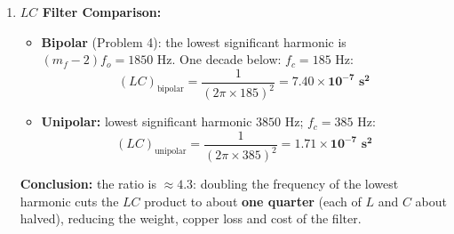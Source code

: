 \documentclass[11pt,a4paper]{article}
\begin{document}
\begin{examplebox}
\begin{enumerate}
  \item \textbf{$LC$ Filter Comparison:}
  \begin{itemize}
    \item \textbf{Bipolar} (Problem 4): the lowest significant harmonic is $(m_f - 2)f_o = 1850\text{ Hz}$. One decade below: $f_{c} = 185\text{ Hz}$:
    \begin{equation*}
    (LC)_{\text{bipolar}} = \frac{1}{(2\pi \times 185)^2} = \mathbf{7.40 \times 10^{-7}\text{ s}^2}
    \end{equation*}
    \item \textbf{Unipolar:} lowest significant harmonic $3850\text{ Hz}$; $f_{c} = 385\text{ Hz}$:
    \begin{equation*}
    (LC)_{\text{unipolar}} = \frac{1}{(2\pi \times 385)^2} = \mathbf{1.71 \times 10^{-7}\text{ s}^2}
    \end{equation*}
  \end{itemize}
  \textbf{Conclusion:} the ratio is $\approx 4.3$: doubling the frequency of the lowest harmonic cuts the $LC$ product to about \textbf{one quarter} (each of $L$ and $C$ about halved), reducing the weight, copper loss and cost of the filter.
\end{enumerate}
\end{examplebox}
\end{document}

